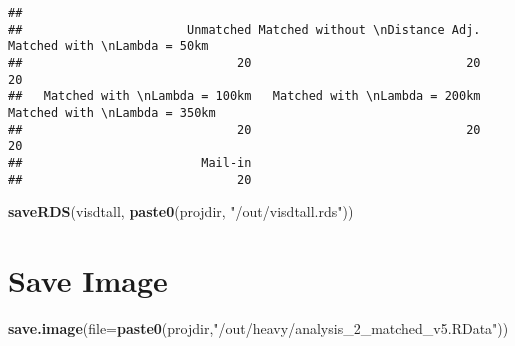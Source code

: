 \documentclass[
]{article}
\newenvironment{Shaded}{\begin{snugshade}}{\end{snugshade}}
\newcommand{\DataTypeTok}[1]{\textcolor[rgb]{0.13,0.29,0.53}{#1}}
\newcommand{\KeywordTok}[1]{\textcolor[rgb]{0.13,0.29,0.53}{\textbf{#1}}}
\newcommand{\NormalTok}[1]{#1}
\newcommand{\StringTok}[1]{\textcolor[rgb]{0.31,0.60,0.02}{#1}}
\begin{document}
\begin{verbatim}
## 
##                       Unmatched Matched without \nDistance Adj.    Matched with \nLambda = 50km 
##                              20                              20                              20 
##   Matched with \nLambda = 100km   Matched with \nLambda = 200km   Matched with \nLambda = 350km 
##                              20                              20                              20 
##                         Mail-in 
##                              20
\end{verbatim}

\begin{Shaded}
\begin{Highlighting}[]
\KeywordTok{saveRDS}\NormalTok{(visdtall, }\KeywordTok{paste0}\NormalTok{(projdir, }\StringTok{"/out/visdtall.rds"}\NormalTok{))}
\end{Highlighting}
\end{Shaded}

\hypertarget{save-image}{%
\section{Save Image}\label{save-image}}

\begin{Shaded}
\begin{Highlighting}[]
\KeywordTok{save.image}\NormalTok{(}\DataTypeTok{file=}\KeywordTok{paste0}\NormalTok{(projdir,}\StringTok{"/out/heavy/analysis_2_matched_v5.RData"}\NormalTok{))}
\end{Highlighting}
\end{Shaded}
\end{document}
